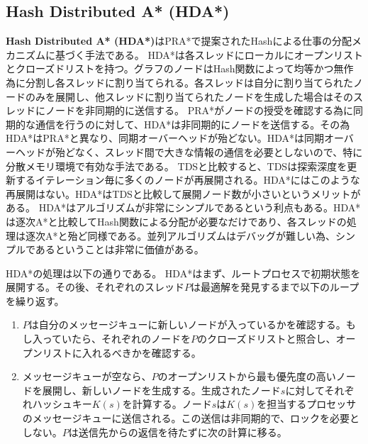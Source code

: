 \documentclass[uplatex]{jsarticle}
\begin{document}
\subsection{Hash Distributed A* (HDA*)}
\textbf{Hash Distributed A* (HDA*)}はPRA*で提案されたHashによる仕事の分配メカニズムに基づく手法である。
HDA*は各スレッドにローカルにオープンリストとクローズドリストを持つ。グラフのノードはHash関数によって均等かつ無作為に分割し各スレッドに割り当てられる。各スレッドは自分に割り当てられたノードのみを展開し、他スレッドに割り当てられたノードを生成した場合はそのスレッドにノードを非同期的に送信する。
PRA*がノードの授受を確認する為に同期的な通信を行うのに対して、HDA*は非同期的にノードを送信する。その為HDA*はPRA*と異なり、同期オーバーヘッドが殆どない。HDA*は同期オーバーヘッドが殆どなく、スレッド間で大きな情報の通信を必要としないので、特に分散メモリ環境で有効な手法である。
TDSと比較すると、TDSは探索深度を更新するイテレーション毎に多くのノードが再展開される。HDA*にはこのような再展開はない。HDA*はTDSと比較して展開ノード数が小さいというメリットがある。
HDA*はアルゴリズムが非常にシンプルであるという利点もある。HDA*は逐次A*と比較してHash関数による分配が必要なだけであり、各スレッドの処理は逐次A*と殆ど同様である。並列アルゴリズムはデバッグが難しい為、シンプルであるということは非常に価値がある。
\newline



HDA*の処理は以下の通りである。
HDA*はまず、ルートプロセスで初期状態を展開する。その後、それぞれのスレッド$P$は最適解を発見するまで以下のループを繰り返す。

\begin{enumerate}
	\item $P$は自分のメッセージキューに新しいノードが入っているかを確認する。もし入っていたら、それぞれのノードを$P$のクローズドリストと照合し、オープンリストに入れるべきかを確認する。
	\item メッセージキューが空なら、$P$のオープンリストから最も優先度の高いノードを展開し、新しいノードを生成する。生成されたノード$s$に対してそれぞれハッシュキー$K(s)$を計算する。ノード$s$は$K(s)$を担当するプロセッサのメッセージキューに送信される。この送信は非同期的で、ロックを必要としない。$P$は送信先からの返信を待たずに次の計算に移る。
\end{enumerate}
\end{document}
